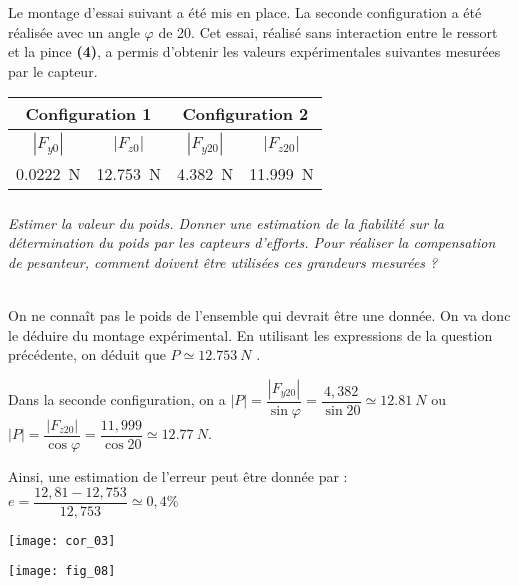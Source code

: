 Le montage d’essai suivant a été mis en place. La seconde configuration a été réalisée avec un angle $\varphi$ de 20\degres. Cet essai, réalisé sans interaction entre le ressort et la pince \textbf{(4)}, a permis d’obtenir les valeurs expérimentales suivantes mesurées par le
capteur.
\begin{center}
\begin{tabular}{|c|c|c|c|}
\hline
\multicolumn{2}{|c|}{Configuration 1}&\multicolumn{2}{c|}{Configuration 2}\\ \hline
$|F_{y0}|$ & $|F_{z0}|$ & $|F_{y20}|$ & $|F_{z20}|$ \\ \hline
\SI{0,0222}{N} & \SI{12,753}{N} & \SI{4,382}{N} & \SI{11,999}{N} \\ \hline
\end{tabular}
\end{center}

\fi
\subparagraph{}
\textit{Estimer la valeur du poids. Donner une estimation de la fiabilité sur la détermination du poids par les capteurs d'efforts. 
Pour réaliser la compensation de pesanteur, comment doivent être utilisées ces grandeurs mesurées ?}
\ifprof
\begin{corrige} ~\\
On ne connaît pas le poids de l'ensemble qui devrait être une donnée. On va donc le déduire du montage expérimental. En utilisant les expressions de la question précédente, on déduit que $P\simeq  \SI{12,753}{N}$ . 

Dans la seconde configuration, on a $|P|=\dfrac{|F_{y20}|}{\sin\varphi}=\dfrac{4,382}{\sin 20}\simeq \SI{12,81}{N}$ ou  $|P|=\dfrac{|F_{z20}|}{\cos\varphi}=\dfrac{11,999}{\cos 20}\simeq \SI{12,77}{N}$.

Ainsi, une estimation de l'erreur peut être donnée par : $e=\dfrac{12,81-12,753}{12,753}\simeq0,4\%$

\begin{center}
\texttt{[image: cor\_03]}
\end{center}

%


\end{corrige}
\else
\begin{center}
\texttt{[image: fig\_08]}
\end{center}

